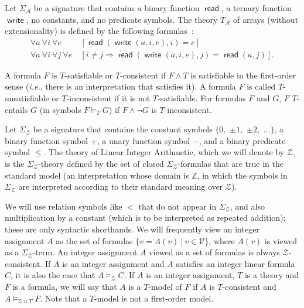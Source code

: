 \documentclass{llncs}
\newcommand{\ie}[0]{\emph{i.e.}, }
\newcommand{\Z}[0]{\ensuremath{\mathcal{Z}}}
\newcommand{\SigmaZ}[0]{\ensuremath{\Sigma_{\mathcal{Z}}}}
\newcommand{\modelsz}[0]{\ensuremath{ \models_{\Z} }}
\newcommand{\modelszt}[0]{\ensuremath{ \models_{\Z \cup T} }}
\newcommand{\set}[2]{\ensuremath{\{#1\ |\ #2\}}}
\DeclareMathOperator{\aread}{\mathsf{read}}
\DeclareMathOperator{\awrite}{\mathsf{write}}
\begin{document}
\begin{example}
  Let $\Sigma_{\mathcal{A}}$ be a signature that contains a binary
  function $\aread$, a ternary function $\awrite$, no constants, and
  no predicate symbols. The theory $T_{\mathcal{A}}$ of arrays
  (without extensionality) is defined by the following
  formulas~\cite{mc62}:
  \begin{align*}
    \forall a\ \forall i\ \forall e\ & [\aread(\awrite(a, i, e), i)
    = e] \\
    \forall a\ \forall i\ \forall j\ \forall e\ & [i \neq j \Rightarrow
    \aread(\awrite(a, i, e), j) = \aread(a, j)].
  \end{align*}
\end{example}

A formula $F$ is $T$-satisfiable or $T$-consistent if $F \wedge T$ is
satisfiable in the first-order sense (\ie there is an interpretation
that satisfies it). A formula $F$ is called $T$-unsatisfiable or
$T$-inconsistent if it is not $T$-satisfiable. For formulas $F$ and
$G$, $F$ $T$-entails $G$ (in symbols $F \models_T G$) if $F \wedge
\neg G$ is $T$-inconsistent.

\begin{definition}
  Let \SigmaZ{} be a signature that contains the constant symbols $\{
  0,$ $\pm 1,$ $\pm 2,$ $\ldots \}$, a binary function symbol $+$, a unary
  function symbol $-$, and a binary predicate symbol $\leq$. The
  theory of Linear Integer Arithmetic, which we will denote by $\Z$,
  is the \SigmaZ{}-theory defined by the set of closed
  \SigmaZ{}-formulas that are true in the standard model (an
  interpretation whose domain is $\mathbb{Z}$, in which the symbols in
  \SigmaZ{} are interpreted according to their standard meaning over
  \Z{}).
\end{definition}

We will use relation symbols like $<$ that do not appear in \SigmaZ{},
and also multiplication by a constant (which is to be interpreted as
repeated addition); these are only syntactic shorthands. We will
frequently view an integer assignment $A$ as the set of formulas
$\set{v = A(v)}{v \in \mathcal{V}}$, where $A(v)$ is viewed as a
\SigmaZ{}-term. An integer assignment $A$ viewed as a set of formulas
is always $\Z$-consistent. If $A$ is an integer assignment and $A$
satisfies an integer linear formula $C$, it is also the case that $A
\modelsz C$.  If $A$ is an integer assignment, $T$ is a theory and $F$
is a formula, we will say that $A$ is a $T$-model of $F$ if $A$ is
$T$-consistent and $A \modelszt F$. Note that a $T$-model is not a
first-order model.
\end{document}
